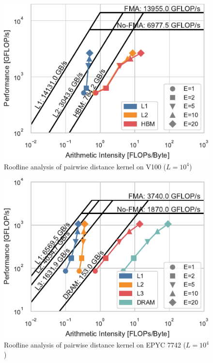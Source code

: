 \documentclass[conference]{IEEEtran}
\begin{document}

\begin{figure}
    \centering
    \includegraphics{figs/roofline_distances_v100}
    \caption{Roofline analysis of pairwise distance kernel on V100 ($L=10^4$)}%
    \label{fig:roofline-distances-v100}
\end{figure}

\begin{figure}
    \centering
    \includegraphics{figs/roofline_distances_epyc}
    \caption{Roofline analysis of pairwise distance kernel on EPYC 7742 ($L=10^4$)}%
    \label{fig:roofline-distances-epyc}
\end{figure}
\end{document}
